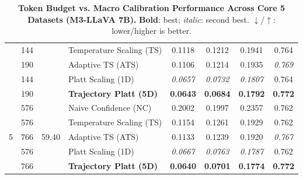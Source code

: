 \begin{table}[t]
\begin{tabular}{ccclcccc}
 & 144 &  & Temperature Scaling (TS) & 0.1118 & 0.1212 & 0.1941 & 0.764 \\
 & 190 &  & Adaptive TS (ATS) & 0.1106 & 0.1214 & 0.1935 & \textit{0.769} \\
 & 144 &  & Platt Scaling (1D) & \textit{0.0657} & \textit{0.0732} & \textit{0.1807} & 0.764 \\
 & 190 &  & \textbf{Trajectory Platt (5D)} & \textbf{0.0643} & \textbf{0.0684} & \textbf{0.1792} & \textbf{0.772} \\
\midrule
\multirow{5}{*}{5} & 576 & \multirow{5}{*}{59.40} & Naive Confidence (NC) & 0.2002 & 0.1997 & 0.2357 & 0.762 \\
 & 576 &  & Temperature Scaling (TS) & 0.1154 & 0.1261 & 0.1929 & 0.762 \\
 & 766 &  & Adaptive TS (ATS) & 0.1133 & 0.1239 & 0.1920 & \textit{0.767} \\
 & 576 &  & Platt Scaling (1D) & \textit{0.0667} & \textit{0.0763} & \textit{0.1787} & 0.762 \\
 & 766 &  & \textbf{Trajectory Platt (5D)} & \textbf{0.0640} & \textbf{0.0701} & \textbf{0.1774} & \textbf{0.772} \\
\bottomrule
\end{tabular}
\caption{\textbf{Token Budget vs. Macro Calibration Performance Across Core 5 Datasets (M3-LLaVA 7B).} \textbf{Bold}: best; \textit{italic}: second best. $\downarrow$/$\uparrow$: lower/higher is better.}
\label{tab:token_budget_macro_core5_m3}
\end{table}
